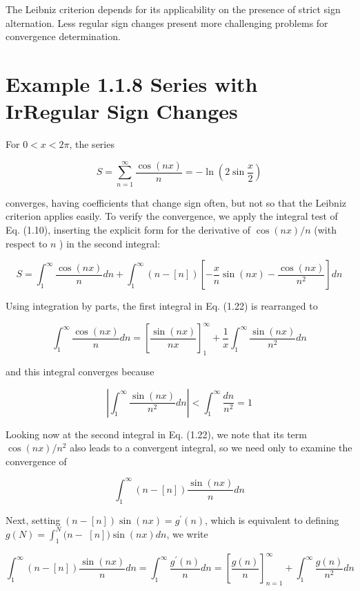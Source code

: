 \documentclass[10pt]{article}
\begin{document}
The Leibniz criterion depends for its applicability on the presence of strict sign alternation. Less regular sign changes present more challenging problems for convergence determination.

\section*{Example 1.1.8 Series with IrRegular Sign Changes}
For $0<x<2 \pi$, the series


\begin{equation*}
S=\sum_{n=1}^{\infty} \frac{\cos (n x)}{n}=-\ln \left(2 \sin \frac{x}{2}\right) \tag{1.21}
\end{equation*}


converges, having coefficients that change sign often, but not so that the Leibniz criterion applies easily. To verify the convergence, we apply the integral test of Eq. (1.10), inserting the explicit form for the derivative of $\cos (n x) / n$ (with respect to $n$ ) in the second integral:


\begin{equation*}
S=\int_{1}^{\infty} \frac{\cos (n x)}{n} d n+\int_{1}^{\infty}(n-[n])\left[-\frac{x}{n} \sin (n x)-\frac{\cos (n x)}{n^{2}}\right] d n \tag{1.22}
\end{equation*}


Using integration by parts, the first integral in Eq. (1.22) is rearranged to

$$
\int_{1}^{\infty} \frac{\cos (n x)}{n} d n=\left[\frac{\sin (n x)}{n x}\right]_{1}^{\infty}+\frac{1}{x} \int_{1}^{\infty} \frac{\sin (n x)}{n^{2}} d n
$$

and this integral converges because

$$
\left|\int_{1}^{\infty} \frac{\sin (n x)}{n^{2}} d n\right|<\int_{1}^{\infty} \frac{d n}{n^{2}}=1
$$

Looking now at the second integral in Eq. (1.22), we note that its term $\cos (n x) / n^{2}$ also leads to a convergent integral, so we need only to examine the convergence of

$$
\int_{1}^{\infty}(n-[n]) \frac{\sin (n x)}{n} d n
$$

Next, setting $(n-[n]) \sin (n x)=g^{\prime}(n)$, which is equivalent to defining $g(N)=\int_{1}^{N}(n-$ $[n]) \sin (n x) d n$, we write

$$
\int_{1}^{\infty}(n-[n]) \frac{\sin (n x)}{n} d n=\int_{1}^{\infty} \frac{g^{\prime}(n)}{n} d n=\left[\frac{g(n)}{n}\right]_{n=1}^{\infty}+\int_{1}^{\infty} \frac{g(n)}{n^{2}} d n
$$
\end{document}
